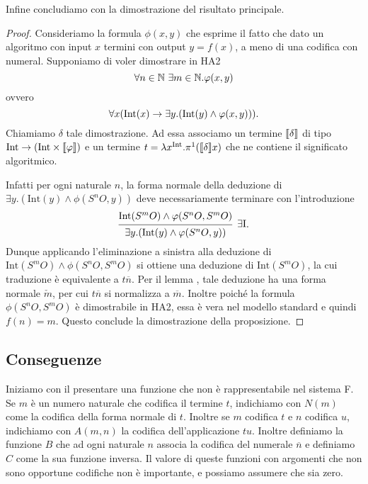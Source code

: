 \documentclass[]{marticle}
\begin{document}
Infine concludiamo con la dimostrazione del risultato principale.
\begin{proof}
    Consideriamo la formula $\phi(x,y)$ che esprime il fatto che dato un
    algoritmo con input $x$ termini con output $y=f(x)$, a meno di una codifica
    con numeral.  Supponiamo di voler dimostrare in HA2
    \[
        \forall n\in\mathbb{N}\ \exists m\in\mathbb{N} . \varphi(x,y)
    \]
    ovvero
    \[
        \forall x (\text{Int}(x)\rightarrow \exists y. (\text{Int}(y)\land \varphi(x,y))).
    \]
    Chiamiamo $\delta$ tale dimostrazione. Ad essa associamo un termine
    $\llbracket \delta \rrbracket$ di tipo $\text{Int}\rightarrow (\text{Int}\times\llbracket \varphi \rrbracket)$ e un termine $t =
    \lambda x^{\text{Int}}.\pi^1(\llbracket \delta \rrbracket x)$ che ne contiene il significato algoritmico.

    Infatti per ogni naturale $n$, la forma normale della deduzione di $\exists
    y.  (\text{Int}(y)\land \phi(S^nO,y))$ deve necessariamente terminare con
    l'introduzione
    \[
        \begin{prooftree}
            \hypo{\text{Int}(S^mO)\land \phi(S^nO,S^mO)} 
            \infer1[$\exists \text{I}$]{\exists y.(\text{Int}(y)\land
                \phi(S^nO,y))}
        \end{prooftree}.
    \]
    Dunque applicando l'eliminazione a sinistra alla deduzione di
    $\text{Int}(S^mO)\land \phi(S^nO,S^mO)$ si ottiene una deduzione di
    $\text{Int}(S^mO)$, la cui traduzione \`e equivalente a $t\overline{n}$. Per
    il lemma , tale deduzione ha una forma normale $\check{m}$, per cui
    $t \overline{n}$ si normalizza a $\overline{m}$. Inoltre poich\'e la formula
    $\phi(S^nO, S^mO)$ \`e dimostrabile in HA2, essa \`e vera nel modello
    standard e quindi $f(n)=m$. Questo conclude la dimostrazione della
    proposizione.
\end{proof}

\subsection{Conseguenze}
Iniziamo con il presentare una funzione che non \`e rappresentabile nel sistema
F. Se $m$ \`e un numero naturale che codifica il termine $t$, indichiamo con
$N(m)$ come la codifica della forma normale di $t$. Inoltre se $m$ codifica $t$
e $n$ codifica $u$, indichiamo con $A(m, n)$ la codifica dell'applicazione $tu$.
Inoltre definiamo la funzione $B$ che ad ogni naturale $n$ associa la codifica
del numerale $\overline{n}$ e definiamo $C$ come la sua funzione inversa. Il
valore di queste funzioni con argomenti che non sono opportune codifiche non \`e
importante, e possiamo assumere che sia zero.
\end{document}
